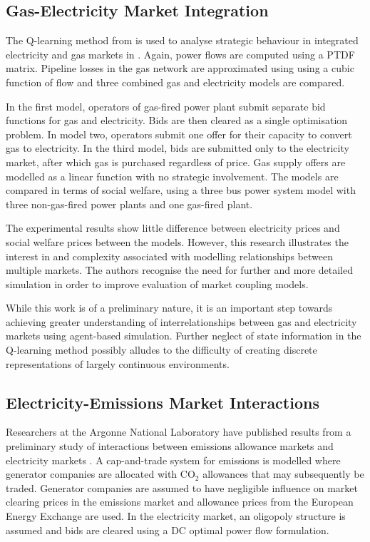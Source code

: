 \subsection{Gas-Electricity Market Integration}
The Q-learning method from  is used to
analyse strategic behaviour in integrated electricity and gas markets in
.  Again, power flows are computed using a PTDF matrix.
Pipeline losses in the gas network are approximated using using a cubic function
of flow and three combined gas and electricity models are compared.

In the first model, operators of gas-fired power plant submit separate bid
functions for gas and electricity.  Bids are then cleared as a single
optimisation problem.  In model two, operators submit one offer for their
capacity to convert gas to electricity.  In the third model, bids are submitted
only to the electricity market, after which gas is purchased regardless of
price.  Gas supply offers are modelled as a linear function with no strategic
involvement.  The models are compared in terms of social welfare, using a three
bus power system model with three non-gas-fired power plants and one gas-fired
plant.

The experimental results show little difference between electricity prices and
social welfare prices between the models.  However, this research illustrates
the interest in and complexity associated with modelling relationships between
multiple markets.  The authors recognise the need for further and more detailed
simulation in order to improve evaluation of market coupling models.

While this work is of a preliminary nature, it is an important step towards
achieving greater understanding of interrelationships between gas and
electricity markets using agent-based simulation.  Further neglect of state
information in the Q-learning method possibly alludes to the difficulty of
creating discrete representations of largely continuous environments.

\subsection{Electricity-Emissions Market Interactions}
Researchers at the Argonne National Laboratory have published results from a
preliminary study of interactions between emissions allowance markets and
electricity markets \cite{wang:09}.  A cap-and-trade system for emissions is
modelled where generator companies are allocated with $\mbox{CO}_2$ allowances
that may subsequently be traded.  Generator companies are assumed to have
negligible influence on market clearing prices in the emissions market and
allowance prices from the European Energy Exchange are used.  In the electricity
market, an oligopoly structure is assumed and bids are cleared using a DC
optimal power flow formulation.

